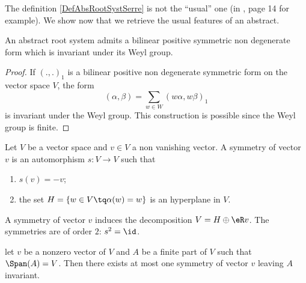 The definition \ref{DefAbsRootSystSerre} is not the ``usual'' one (in \cite{Wisser}, page 14 for example). We show now that we retrieve the usual features of an abstract.

\begin{lemma}
    An abstract root system admits a bilinear positive symmetric non degenerate form which is invariant under its Weyl group.
\end{lemma}

\begin{proof}
    If \( (.,.)_1\) is a bilinear positive non degenerate symmetric form on the vector space \( V\), the form
    \begin{equation}
        (\alpha,\beta)=\sum_{w\in W}(w\alpha,w\beta)_1
    \end{equation}
    is invariant under the Weyl group. This construction is possible since the Weyl group is finite.
\end{proof}

\begin{definition}
    Let \( V\) be a vector space and \( v\in V\) a non vanishing vector. A symmetry of vector \( v\) is an automorphism \( s\colon V\to V\) such that
    \begin{enumerate}
        \item
            \( s(v)=-v\);
        \item
            the set \( H=\{ w\in V\tq \alpha(w)=w \}\) is an hyperplane in \( V\).
    \end{enumerate}
\end{definition}
A symmetry of vector \( v\) induces the decomposition \( V=H\oplus\eR v\). The symmetries are of order \( 2\): \( s^2=\id\).

\begin{lemma}
    let \( v\) be a nonzero vector of \( V\) and \( A\) be a finite part of \( V\) such that \( \Span(A)=V\). Then there exists at most one symmetry of vector \( v\) leaving \( A\) invariant.
\end{lemma}

